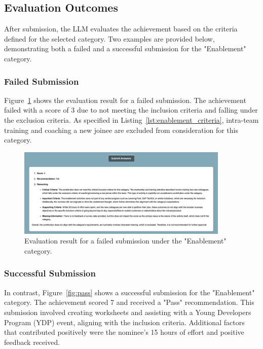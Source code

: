 \subsection{Evaluation Outcomes}
After submission, the \ac{LLM} evaluates the achievement based on the criteria defined for the selected category. 
Two examples are provided below, demonstrating both a failed and a successful submission for the "Enablement" category.

\subsubsection{Failed Submission}
Figure~\ref{fig:fail} shows the evaluation result for a failed submission. The achievement failed with a score of 3 due to not meeting the inclusion criteria and falling under the exclusion criteria. 
As specified in Listing~\ref{lst:enablement_criteria}, intra-team training and coaching a new joinee are excluded from consideration for this category.

\begin{figure}[H]
    \centering
    \includegraphics[width=0.9\textwidth]{img/fail.jpeg}
    \caption{Evaluation result for a failed submission under the "Enablement" category.}
    \label{fig:fail}
\end{figure}

\subsubsection{Successful Submission}
In contrast, Figure~\ref{fig:pass} shows a successful submission for the "Enablement" category. The achievement scored 7 and received a "Pass" recommendation. 
This submission involved creating worksheets and assisting with a Young Developers Program (YDP) event, aligning with the inclusion criteria. 
Additional factors that contributed positively were the nominee's 15 hours of effort and positive feedback received.

